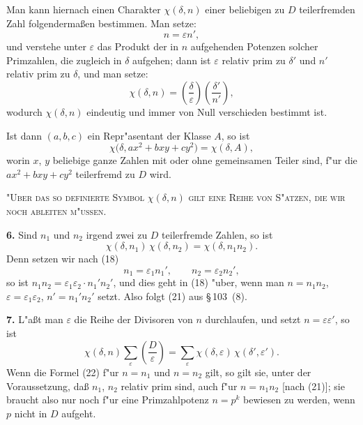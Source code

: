 \documentclass[11pt,a4paper]{article}
\theoremstyle{plain}
\newcommand{\sect}[1]{\S\,#1}
\begin{document}
\newpage
\setcounter{page}{384}

Man kann hiernach einen Charakter $\chi(\delta, n)$ einer beliebigen zu $D$ teilerfremden Zahl folgenderma\ss{}en bestimmen. Man setze:
\begin{equation}
\label{eq:104_18}
n = \varepsilon n',
\end{equation}
und verstehe unter $\varepsilon$ das Produkt der in $n$ aufgehenden Potenzen solcher Primzahlen, die zugleich in $\delta$ aufgehen; dann ist $\varepsilon$ relativ prim zu $\delta'$ und $n'$ relativ prim zu $\delta$, und man setze:
\begin{equation}
\label{eq:104_19}
\chi(\delta, n) = \left(\frac{\delta}{\varepsilon}\right)\left(\frac{\delta'}{n'}\right),
\end{equation}
wodurch $\chi(\delta, n)$ eindeutig und immer von Null verschieden bestimmt ist.

Ist dann $(a, b, c)$ ein Repr"{a}sentant der Klasse $A$, so ist
\begin{equation}
\label{eq:104_20}
\chi\bigl(\delta, ax^2 + bxy + cy^2\bigr) = \chi(\delta, A),
\end{equation}
worin $x$, $y$ beliebige ganze Zahlen mit oder ohne gemeinsamen Teiler sind, f"{u}r die $ax^2 + bxy + cy^2$ teilerfremd zu $D$ wird.

\textsc{"{U}ber das so definierte Symbol $\chi(\delta, n)$ gilt eine Reihe von S"{a}tzen, die wir noch ableiten m"{u}ssen.}

\smallskip

\textbf{6.} Sind $n_1$ und $n_2$ irgend zwei zu $D$ teilerfremde Zahlen, so ist
\begin{equation}
\label{eq:104_21}
\chi(\delta, n_1)\,\chi(\delta, n_2) = \chi(\delta, n_1n_2).
\end{equation}
Denn setzen wir nach (18)
\[
n_1 = \varepsilon_1 n_1', \qquad n_2 = \varepsilon_2 n_2',
\]
so ist $n_1n_2 = \varepsilon_1\varepsilon_2 \cdot n_1'n_2'$, und dies geht in (18) "{u}ber, wenn man $n = n_1n_2$, $\varepsilon = \varepsilon_1\varepsilon_2$, $n' = n_1'n_2'$ setzt. Also folgt (21) aus \sect{103}~(8).

\smallskip

\textbf{7.} L"{a}\ss{}t man $\varepsilon$ die Reihe der Divisoren von $n$ durchlaufen, und setzt $n = \varepsilon\varepsilon'$, so ist
\begin{equation}
\label{eq:104_22}
\chi(\delta, n) \sum_{\varepsilon} \left(\frac{D}{\varepsilon}\right) = \sum_{\varepsilon} \chi(\delta, \varepsilon)\,\chi(\delta', \varepsilon').
\end{equation}
Wenn die Formel (22) f"{u}r $n = n_1$ und $n = n_2$ gilt, so gilt sie, unter der Voraussetzung, da\ss{} $n_1$, $n_2$ relativ prim sind, auch f"{u}r $n = n_1n_2$ [nach (21)]; sie braucht also nur noch f"{u}r eine Primzahlpotenz $n = p^k$ bewiesen zu werden, wenn $p$ nicht in $D$ aufgeht.
\end{document}
